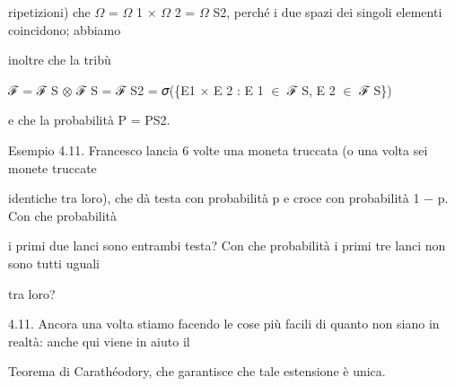 \documentclass[a4paper,portrait,12pt]{article}
\begin{document}
\begin{flushleft}
ripetizioni) che $\Omega$ = $\Omega$ 1 × $\Omega$ 2 = $\Omega$ S2, perch\'{e} i due spazi dei singoli elementi coincidono; abbiamo
\end{flushleft}


\begin{flushleft}
inoltre che la tribù
\end{flushleft}





\begin{flushleft}
ℱ = ℱ S $\otimes$ ℱ S = ℱ S2 = 𝜎(\{E1 × E 2 : E 1 $\in$ ℱ S, E 2 $\in$ ℱ S\})
\end{flushleft}


\begin{flushleft}
e che la probabilit\`{a} P = PS2.
\end{flushleft}


\begin{flushleft}
Esempio 4.11. Francesco lancia 6 volte una moneta truccata (o una volta sei monete truccate
\end{flushleft}


\begin{flushleft}
identiche tra loro), che d\`{a} testa con probabilit\`{a} p e croce con probabilit\`{a} 1 $-$ p. Con che probabilit\`{a}
\end{flushleft}


\begin{flushleft}
i primi due lanci sono entrambi testa? Con che probabilit\`{a} i primi tre lanci non sono tutti uguali
\end{flushleft}


\begin{flushleft}
tra loro?
\end{flushleft}


\begin{flushleft}
4.11. Ancora una volta stiamo facendo le cose più facili di quanto non siano in realt\`{a}: anche qui viene in aiuto il
\end{flushleft}


\begin{flushleft}
Teorema di Carath\'{e}odory, che garantisce che tale estensione \`{e} unica.
\end{flushleft}





\end{document}
